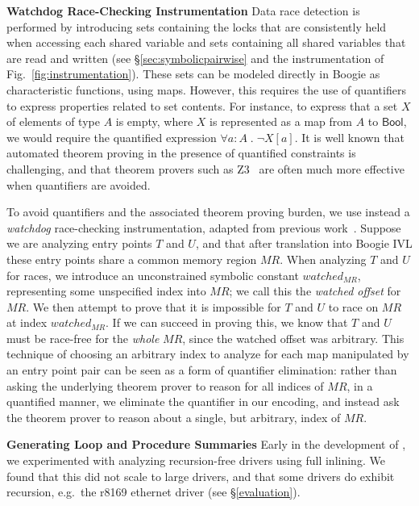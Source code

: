 \noindent\textbf{Watchdog Race-Checking Instrumentation }
%
Data race detection is performed by introducing sets containing the locks that are consistently held when accessing each shared variable and sets containing all shared variables that are read and written (see \S\ref{sec:symbolicpairwise} and the instrumentation of Fig.~\ref{fig:instrumentation}). These sets can be modeled directly in Boogie as characteristic functions, using maps. However, this requires the use of quantifiers to express properties related to set contents.  For instance, to express that a set $X$ of elements of type $A$ is empty, where $X$ is represented as a map from $A$ to $\mathsf{Bool}$, we would require the quantified expression $\forall a : A\;.\; \neg X[a]$.  It is well known that automated theorem proving in the presence of quantified constraints is challenging, and that theorem provers such as Z3~\cite{de2008z3} are often much more effective when quantifiers are avoided.  

To avoid quantifiers and the associated theorem proving burden, we use instead a \emph{watchdog} race-checking instrumentation, adapted from previous work~\cite{bardsley2014engineering}.  Suppose we are analyzing entry points $T$ and $U$, and that after translation into Boogie IVL these entry points share a common memory region $\mathit{MR}$.  When analyzing $T$ and $U$ for races, we introduce an unconstrained symbolic constant $\mathit{watched}_{\mathit{MR}}$, representing some unspecified index into $\mathit{MR}$; we call this the \emph{watched offset} for $\mathit{MR}$.  We then attempt to prove that it is impossible for $T$ and $U$ to race on $\mathit{MR}$ at index $\mathit{watched}_{\mathit{MR}}$.  If we can succeed in proving this, we know that $T$ and $U$ must be race-free for the \emph{whole} $\mathit{MR}$, since the watched offset was arbitrary.  This technique of choosing an arbitrary index to analyze for each map manipulated by an entry point pair can be seen as a form of quantifier elimination: rather than asking the underlying theorem prover to reason for all indices of $\mathit{MR}$, in a quantified manner, we eliminate the quantifier in our encoding, and instead ask the theorem prover to reason about a single, but arbitrary, index of $\mathit{MR}$.

\noindent\textbf{Generating Loop and Procedure Summaries }
%
Early in the development of \whoop, we experimented with analyzing recursion-free drivers using full inlining.  We found that this did not scale to large drivers, and that some drivers do exhibit recursion, e.g.\ the r8169 ethernet driver (see \S\ref{evaluation}).

